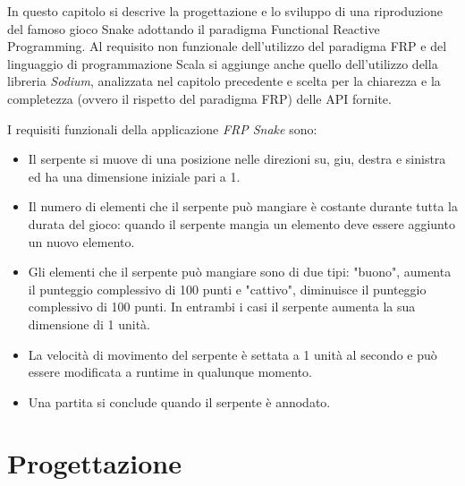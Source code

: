 \documentclass[../main.tex]{subfiles}
\begin{document}
In questo capitolo si descrive la progettazione e lo sviluppo di una riproduzione del famoso gioco Snake adottando il paradigma Functional Reactive Programming. Al requisito non funzionale dell'utilizzo del paradigma FRP e del linguaggio di programmazione Scala si aggiunge anche quello dell'utilizzo della libreria \textit{Sodium}, analizzata nel capitolo precedente e scelta per la chiarezza e la completezza (ovvero il rispetto del paradigma FRP) delle API fornite.

I requisiti funzionali della applicazione \textit{FRP Snake} sono:
\begin{itemize}
    \item Il serpente si muove di una posizione nelle direzioni su, giu, destra e sinistra ed ha una dimensione iniziale pari a 1.
    \item Il numero di elementi che il serpente può mangiare è costante durante tutta la durata del gioco: quando il serpente mangia un elemento deve essere aggiunto un nuovo elemento.
    \item Gli elementi che il serpente può mangiare sono di due tipi: "buono", aumenta il punteggio complessivo di 100 punti e "cattivo", diminuisce il punteggio complessivo di 100 punti. In entrambi i casi il serpente aumenta la sua dimensione di 1 unità.
    \item La velocità di movimento del serpente è settata a 1 unità al secondo e può essere modificata a runtime in qualunque momento.
    \item Una partita si conclude quando il serpente è annodato.
\end{itemize}

\section{Progettazione}
\end{document}
